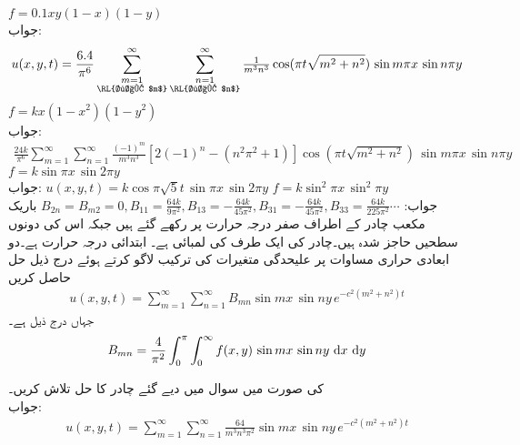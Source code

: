 \quad
$f=0.1xy(1-x)(1-y)$\\
جواب:\quad
\begin{align*}
u(x,y,t)=\frac{6.4}{\pi^6}\sum_{\substack{m=1\\\text{\RL{طاق $m$}}}}^{\infty}\sum_{\substack{n=1\\\text{\RL{طاق $n$}}}}^{\infty} \tfrac{1}{m^3n^3}\cos (\pi t\sqrt{m^2+n^2})\,\sin m\pi x\,\sin n\pi y
\end{align*}
\quad
$f=kx(1-x^2)(1-y^2)$\\
جواب:\quad
\begin{align*}
\frac{24k}{\pi^6}\sum_{m=1}^{\infty}\sum_{n=1}^{\infty} \tfrac{(-1)^m}{m^3n^3}[2(-1)^n-(n^2\pi^2+1)]\cos (\pi t\sqrt{m^2+n^2})\,\sin m\pi x\,\sin n\pi y
\end{align*}
\quad
$f=k\sin \pi x\,\sin 2\pi y$\\
جواب:\quad
$u(x,y,t)=k\cos \pi \sqrt{5}t\,\sin \pi x\,\sin 2\pi y$
\quad
$f=k\sin^2 \pi x\,\sin^2\pi y$\\
جواب:\quad
$B_{2n}=B_{m2}=0,B_{11}=\tfrac{64k}{9\pi^2},B_{13}=-\tfrac{64k}{45\pi^2}, B_{31}=-\tfrac{64k}{45\pi^2},B_{33}=\tfrac{64k}{225\pi^2}\cdots $
\quad
باریک مکعب چادر کے اطراف صفر درجہ حرارت پر رکھے گئے ہیں جبکہ اس کی دونوں سطحیں حاجز شدہ ہیں۔چادر کی ایک طرف کی لمبائی  ہے۔ ابتدائی درجہ حرارت  ہے۔دو ابعادی حراری مساوات  پر علیحدگی متغیرات کی ترکیب لاگو کرتے ہوئے درج ذیل حل حاصل کریں
\begin{align*}
u(x,y,t)=\sum_{m=1}^{\infty}\sum_{n=1}^{\infty} B_{mn}\sin mx \,\sin ny\,e^{-c^2(m^2+n^2)t}
\end{align*}
جہاں  درج ذیل ہے۔
\begin{align*}
B_{mn}=\frac{4}{\pi^2}\int_0^{\pi}\int_0^{\infty} f(x,y)\,\sin mx\,\sin ny\,\dif x\,\dif y
\end{align*}
 
\quad
{} کی صورت میں سوال  میں دیے گئے چادر کا حل تلاش کریں۔\\
جواب:\quad
\begin{align*}
u(x,y,t)=\sum_{m=1}^{\infty}\sum_{n=1}^{\infty} \frac{64}{m^3n^3\pi^2}\sin mx \,\sin ny\,e^{-c^2(m^2+n^2)t}
\end{align*}

